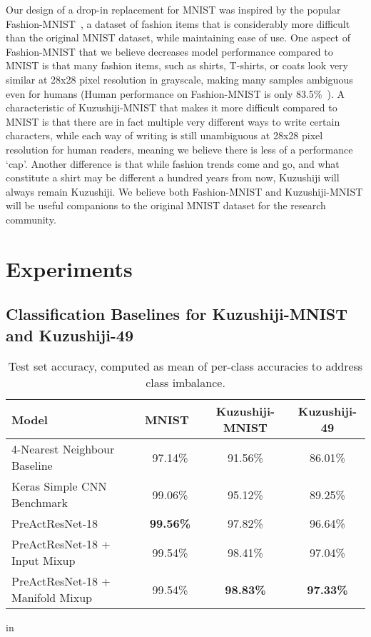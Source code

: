 \documentclass{article}
\begin{document}
\begin{CJK}{UTF8}{min}
Our design of a drop-in replacement for MNIST was inspired by the popular Fashion-MNIST~\cite{xiao2017fashion}, a dataset of fashion items that is considerably more difficult than the original MNIST dataset, while maintaining ease of use. One aspect of Fashion-MNIST that we believe decreases model performance compared to MNIST is that many fashion items, such as shirts, T-shirts, or coats look very similar at 28x28 pixel resolution in grayscale, making many samples ambiguous even for humans (Human performance on Fashion-MNIST is only 83.5\%~\cite{xiao2017fashionrepo}). A characteristic of Kuzushiji-MNIST that makes it more difficult compared to MNIST is that there are in fact multiple very different ways to write certain characters, while each way of writing is still unambiguous at 28x28 pixel resolution for human readers, meaning we believe there is less of a performance `cap'. Another difference is that while fashion trends come and go, and what constitute a shirt may be different a hundred years from now, Kuzushiji will always remain Kuzushiji. We believe both Fashion-MNIST and Kuzushiji-MNIST will be useful companions to the original MNIST dataset for the research community.

\section{Experiments}

\subsection{Classification Baselines for Kuzushiji-MNIST and Kuzushiji-49}

\begin{table}[!htb]
\begin{center}
\begin{small}
\begin{tabular}{lccc}
\toprule
Model & MNIST~\cite{lecun1998mnist} & Kuzushiji-MNIST & Kuzushiji-49\\
\midrule
4-Nearest Neighbour Baseline & 97.14\% & 91.56\% & 86.01\% \\
Keras Simple CNN Benchmark~\cite{chollet2015keras} & 99.06\% & 95.12\% & 89.25\% \\
PreActResNet-18~\cite{he2016identity} & \textbf{99.56\%} & 97.82\% & 96.64\% \\
PreActResNet-18 + Input Mixup~\cite{zhang2017mixup} & 99.54\% & 98.41\% & 97.04\% \\
PreActResNet-18 + Manifold Mixup~\cite{verma2018manifold} & 99.54\% & \textbf{98.83\%} & \textbf{97.33\%} \\
\bottomrule
\end{tabular}
\end{small}
\end{center}
\caption{Test set accuracy, computed as mean of per-class accuracies to address class imbalance.}
\label{tab:baseline_accuracies}
 in
\end{table}


\end{CJK}
\end{document}
